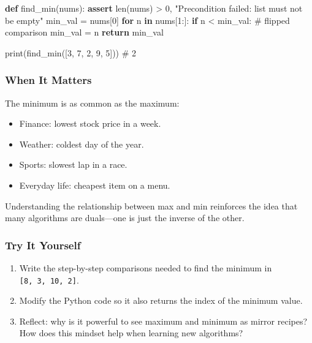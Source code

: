 \documentclass[
  letterpaper,
  DIV=11,
  numbers=noendperiod]{scrreprt}
\newenvironment{Shaded}{\begin{snugshade}}{\end{snugshade}}
\newcommand{\BuiltInTok}[1]{\textcolor[rgb]{0.00,0.23,0.31}{#1}}
\newcommand{\CommentTok}[1]{\textcolor[rgb]{0.37,0.37,0.37}{#1}}
\newcommand{\ControlFlowTok}[1]{\textcolor[rgb]{0.00,0.23,0.31}{\textbf{#1}}}
\newcommand{\DecValTok}[1]{\textcolor[rgb]{0.68,0.00,0.00}{#1}}
\newcommand{\KeywordTok}[1]{\textcolor[rgb]{0.00,0.23,0.31}{\textbf{#1}}}
\newcommand{\NormalTok}[1]{\textcolor[rgb]{0.00,0.23,0.31}{#1}}
\newcommand{\OperatorTok}[1]{\textcolor[rgb]{0.37,0.37,0.37}{#1}}
\newcommand{\StringTok}[1]{\textcolor[rgb]{0.13,0.47,0.30}{#1}}
\providecommand{\tightlist}{%
  \setlength{\itemsep}{0pt}\setlength{\parskip}{0pt}}
\begin{document}
\begin{Shaded}
\begin{Highlighting}[]
\KeywordTok{def}\NormalTok{ find\_min(nums):}
    \ControlFlowTok{assert} \BuiltInTok{len}\NormalTok{(nums) }\OperatorTok{\textgreater{}} \DecValTok{0}\NormalTok{, }\StringTok{"Precondition failed: list must not be empty"}
\NormalTok{    min\_val }\OperatorTok{=}\NormalTok{ nums[}\DecValTok{0}\NormalTok{]}
    \ControlFlowTok{for}\NormalTok{ n }\KeywordTok{in}\NormalTok{ nums[}\DecValTok{1}\NormalTok{:]:}
        \ControlFlowTok{if}\NormalTok{ n }\OperatorTok{\textless{}}\NormalTok{ min\_val:   }\CommentTok{\# flipped comparison}
\NormalTok{            min\_val }\OperatorTok{=}\NormalTok{ n}
    \ControlFlowTok{return}\NormalTok{ min\_val}

\BuiltInTok{print}\NormalTok{(find\_min([}\DecValTok{3}\NormalTok{, }\DecValTok{7}\NormalTok{, }\DecValTok{2}\NormalTok{, }\DecValTok{9}\NormalTok{, }\DecValTok{5}\NormalTok{]))  }\CommentTok{\# 2}
\end{Highlighting}
\end{Shaded}

\subsubsection{When It Matters}\label{when-it-matters-96}

The minimum is as common as the maximum:

\begin{itemize}
\tightlist
\item
  Finance: lowest stock price in a week.
\item
  Weather: coldest day of the year.
\item
  Sports: slowest lap in a race.
\item
  Everyday life: cheapest item on a menu.
\end{itemize}

Understanding the relationship between max and min reinforces the idea
that many algorithms are duals---one is just the inverse of the other.

\subsubsection{Try It Yourself}\label{try-it-yourself-98}

\begin{enumerate}
\def\labelenumi{\arabic{enumi}.}
\tightlist
\item
  Write the step-by-step comparisons needed to find the minimum in
  \texttt{{[}8,\ 3,\ 10,\ 2{]}}.
\item
  Modify the Python code so it also returns the index of the minimum
  value.
\item
  Reflect: why is it powerful to see maximum and minimum as mirror
  recipes? How does this mindset help when learning new algorithms?
\end{enumerate}
\end{document}
